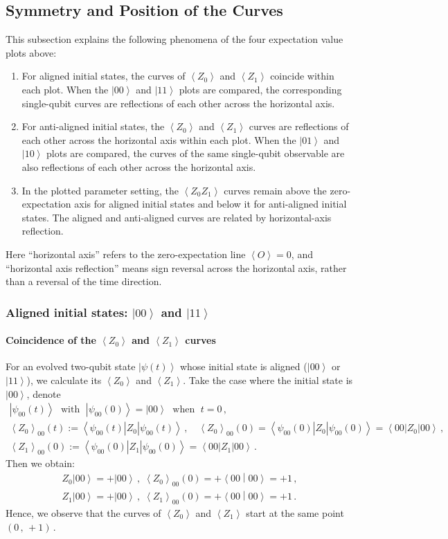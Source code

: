 \documentclass[11pt]{article}
\numberwithin{equation}{section}
\newcommand{\bra}[1]{\left\langle #1 \right|} %
\newcommand{\ket}[1]{\left| #1 \right\rangle} %
\newcommand{\braket}[2]{\left\langle #1 \middle| #2 \right\rangle} %
\newcommand{\ev}[1]{\left\langle #1 \right\rangle} %
\begin{document}
\subsection{Symmetry and Position of the Curves}
This subsection explains the following phenomena of the four expectation value plots above:
\begin{enumerate}
  \item For aligned initial states, the curves of $\ev{Z_0}$ and $\ev{Z_1}$ coincide within each plot. When the $\ket{00}$ and $\ket{11}$ plots are compared, the corresponding single-qubit curves are reflections of each other across the horizontal axis.
  \item For anti-aligned initial states, the $\ev{Z_0}$ and $\ev{Z_1}$ curves are reflections of each other across the horizontal axis within each plot. When the $\ket{01}$ and $\ket{10}$ plots are compared, the curves of the same single-qubit
  observable are also reflections of each other across the horizontal axis.
  \item In the plotted parameter setting, the $\ev{Z_0Z_1}$ curves remain above the zero-expectation axis for aligned initial states and below it for anti-aligned initial states. The aligned and anti-aligned curves are related by horizontal-axis reflection.
\end{enumerate}
Here ``horizontal axis'' refers to the zero-expectation line $\ev{O}=0$, and ``horizontal axis reflection'' means sign reversal across the horizontal axis, rather than a reversal of the time direction.

\subsubsection{Aligned initial states: \texorpdfstring{$\ket{00}$ and $\ket{11}$}{|00> and |11>}}
\paragraph{Coincidence of the $\ev{Z_0}$ and $\ev{Z_1}$ curves}
For an evolved two-qubit state $\ket{\psi(t)}$ whose initial state is aligned ($\ket{00}$ or $\ket{11}$), we calculate its $\ev{Z_0}$ and $\ev{Z_1}$. Take the case where the initial state is $\ket{00}$, denote
\begin{gather*}
    \ket{\psi_{00}(t)} \; \text{ with } \; \ket{\psi_{00}(0)} = \ket{00}
    \; \text{ when } \; t = 0 \,,\\
    \ev{Z_0}_{00}(t) := \bra{\psi_{00}(t)} Z_0 \ket{\psi_{00}(t)} \,,\quad
    \ev{Z_0}_{00}(0) = \bra{\psi_{00}(0)} Z_0 \ket{\psi_{00}(0)} = \bra{00} Z_0 \ket{00} \,, \\
    \ev{Z_1}_{00}(0) := \bra{\psi_{00}(0)} Z_1 \ket{\psi_{00}(0)} = \bra{00} Z_1 \ket{00}\,.
\end{gather*}
Then we obtain:
\begin{align*}
    Z_0\ket{00} = +\ket{00} \,, \; \ev{Z_0}_{00}(0) =  +\braket{00}{00} = +1 \,, \\
    Z_1\ket{00} = +\ket{00} \,, \; \ev{Z_1}_{00}(0) =  +\braket{00}{00} = +1 \,.
\end{align*}
Hence, we observe that the curves of $\ev{Z_0}$ and $\ev{Z_1}$ start at the same point $(0 \,,\, +1)$\,.
\end{document}
